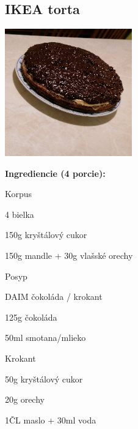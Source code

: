 \setcounter{step}{0}

\subsection{ IKEA torta }

\begin{ingredient}
  
      \includegraphics[height=5.5cm]{images/daim}
  
  \def\portions{  }
  \textbf{ {\normalsize Ingrediencie (4 porcie):} }

  \begin{main}
      \item 
  \end{main}
  
    \begin{subingredient}{Korpus}
        \item 4 bielka
        \item 150g kryštálový cukor
        \item 150g mandle + 30g vlašské orechy
    \end{subingredient}
  
    \begin{subingredient}{Posyp}
        \item DAIM čokoláda / krokant
        \item 125g čokoláda
        \item 50ml smotana/mlieko
    \end{subingredient}
  
    \begin{subingredient}{Krokant}
        \item 50g kryštálový cukor
        \item 20g orechy
        \item 1ČL maslo + 30ml voda
    \end{subingredient}
  
\end{ingredient}
